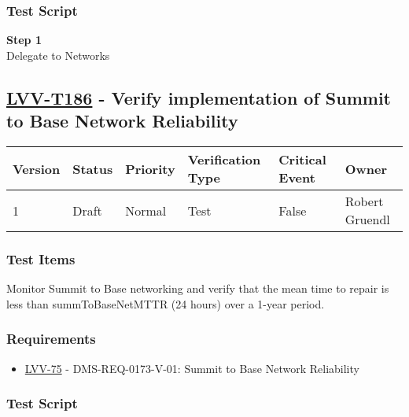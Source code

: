 \subsubsection{Test Script}\label{test-script-44}

\textbf{Step 1}\\
Delegate to Networks\\[2\baselineskip]

\hypertarget{lvv-t186---verify-implementation-of-summit-to-base-network-reliability}{\subsection{\texorpdfstring{\href{https://jira.lsstcorp.org/secure/Tests.jspa\#/testCase/LVV-T186}{LVV-T186}
- Verify implementation of Summit to Base Network
Reliability}{LVV-T186 - Verify implementation of Summit to Base Network Reliability}}\label{lvv-t186---verify-implementation-of-summit-to-base-network-reliability}}

\begin{longtable}[]{@{}llllll@{}}
\toprule
Version & Status & Priority & Verification Type & Critical Event &
Owner\tabularnewline
\midrule
\endhead
1 & Draft & Normal & Test & False & Robert Gruendl\tabularnewline
\bottomrule
\end{longtable}

\subsubsection{Test Items}\label{test-items-45}

Monitor Summit to Base networking and verify that the mean time to
repair is less than summToBaseNetMTTR (24 hours) over a 1-year period.

\subsubsection{Requirements}\label{requirements-45}

\begin{itemize}
\tightlist
\item
  \href{https://jira.lsstcorp.org/browse/LVV-75}{LVV-75} -
  DMS-REQ-0173-V-01: Summit to Base Network Reliability
\end{itemize}

\subsubsection{Test Script}\label{test-script-45}

